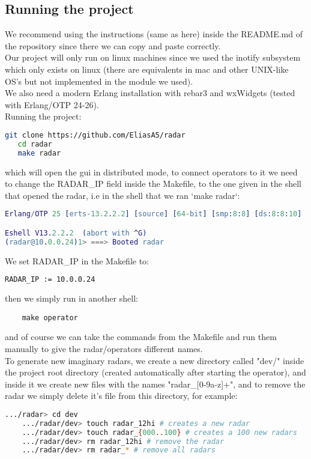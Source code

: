 \documentclass{article}
\begin{document}
\subsection{Running the project}
We recommend using the instructions (same as here) inside the README.md of the repository since there we can copy and paste correctly.\\
Our project will only run on linux machines since we used the inotify subsystem which only exists on linux (there are equivalents in mac and other UNIX-like OS's but not implemented in the module we used).\\
We also need a modern Erlang installation with rebar3 and wxWidgets (tested with Erlang/OTP 24-26).\\
Running the project:
\begin{lstlisting}[language=Bash]
   git clone https://github.com/EliasA5/radar
   cd radar
   make radar
\end{lstlisting}
which will open the gui in distributed mode, to connect operators to it we need to change the RADAR\_IP field inside the Makefile, to the one given in the shell that opened the radar, i.e in the shell that we ran `make radar`:
\begin{lstlisting}[language=Erlang]
Erlang/OTP 25 [erts-13.2.2.2] [source] [64-bit] [smp:8:8] [ds:8:8:10] [async-threads:1] [jit:ns]

Eshell V13.2.2.2  (abort with ^G)
(radar@10.0.0.24)1> ===> Booted radar
\end{lstlisting}
We set RADAR\_IP in the Makefile to:
\begin{lstlisting}[language=Bash]
    RADAR_IP := 10.0.0.24
\end{lstlisting}
then we simply run in another shell:
\begin{lstlisting}
    make operator
\end{lstlisting}
and of course we can take the commands from the Makefile and run them manually to give the radar/operators different names.\\
To generate new imaginary radars, we create a new directory called "dev/" inside the project root directory (created automatically after starting the operator), and inside it we create new files with the names "radar\_[0-9a-z]+", and to remove the radar we simply delete it's file from this directory, for example:
\begin{lstlisting}[language=Bash]
    .../radar> cd dev
    .../radar/dev> touch radar_12hi # creates a new radar
    .../radar/dev> touch radar_{000..100} # creates a 100 new radars
    .../radar/dev> rm radar_12hi # remove the radar
    .../radar/dev> rm radar_* # remove all radars
\end{lstlisting}
\end{document}
